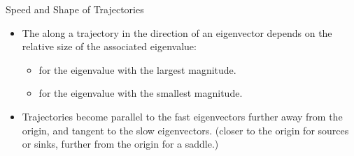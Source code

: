 \documentclass{beamer}
\begin{document}
\begin{frame}
\onslide<+->
\begin{block}{Speed and Shape of Trajectories}
\begin{itemize}[<+- | alert@+>]
\item The  along a trajectory in the direction of an eigenvector depends on the relative size of the associated eigenvalue:
\begin{itemize}
\item {} for the eigenvalue with the largest magnitude.
\item {} for the eigenvalue with the smallest magnitude.
\end{itemize}
\item Trajectories become parallel to the fast eigenvectors further away from the origin, and tangent to the slow eigenvectors. (closer to the origin for sources or sinks, further from the origin for a saddle.)
\end{itemize}
\end{block}
\end{frame}
\end{document}
